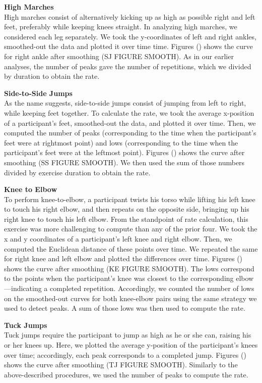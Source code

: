 \textbf{High Marches} \\
High marches consist of alternatively kicking up as high as possible right and left feet, preferably while keeping knees straight. In analyzing high marches, we considered each leg separately. We took the y-coordinates of left and right ankles, smoothed-out the data and plotted it over time time. Figures () shows the curve for right ankle after smoothing (SJ FIGURE SMOOTH). As in our earlier analyses, the number of peaks gave the number of repetitions, which we divided by duration to obtain the rate.

\textbf{Side-to-Side Jumps} \\
As the name suggests, side-to-side jumps consist of jumping from left to right, while keeping feet together. To calculate the rate, we took the average x-position of a participant’s feet, smoothed-out the data, and plotted it over time. Then, we computed the number of peaks (corresponding to the time when the participant’s feet were at rightmost point) and lows (corresponding to the time when the participant’s feet were at the leftmost point). Figures () shows the curve after smoothing (SS FIGURE SMOOTH). We then used the sum of those numbers divided by exercise duration to obtain the rate.

\textbf{Knee to Elbow} \\
To perform knee-to-elbow, a participant twists his torso while lifting his left knee to touch his right elbow, and then repeats on the opposite side, bringing up his right knee to touch his left elbow. From the standpoint of rate calculation, this exercise was more challenging to compute than any of the prior four. We took the x and y coordinates of a participant’s left knee and right elbow. Then, we computed the Euclidean distance of these points over time. We repeated the same for right knee and left elbow and plotted the differences over time. Figures () shows the curve after smoothing (KE FIGURE SMOOTH). The lows correspond to the points when the participant's knee was closest to the corresponding elbow—indicating a completed repetition. Accordingly, we counted the number of lows on the smoothed-out curves for both knee-elbow pairs using the same strategy we used to detect peaks. A sum of those lows was then used to compute the rate.

\textbf{Tuck Jumps} \\
Tuck jumps require the participant to jump as high as he or she can, raising his or her knees up. Here, we plotted the average y-position of the participant’s knees over time; accordingly, each peak corresponds to a completed jump. Figures () shows the curve after smoothing (TJ FIGURE SMOOTH). Similarly to the above-described procedures, we used the number of peaks to compute the rate.

